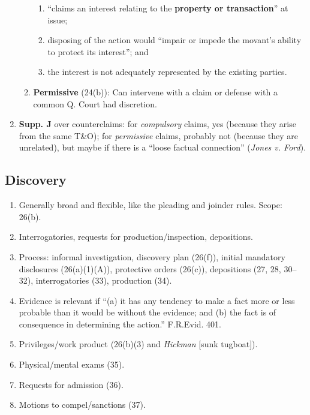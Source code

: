 \begin{enumerate}
\begin{enumerate}
        \begin{enumerate}
            \item ``claims an interest relating to the \textbf{property or 
            transaction}'' at issue;
            \item disposing of the action would ``impair or impede the 
            movant's ability to protect its interest''; and
            \item the interest is not adequately represented by the existing 
            parties.
        \end{enumerate}
        \item \textbf{Permissive} (24(b)): Can intervene with a claim or 
        defense with a common Q. Court had discretion.
    \end{enumerate}
    \item \textbf{Supp. J} over counterclaims: for \emph{compulsory} claims, 
    yes (because they arise from the same T\&O); for \emph{permissive} claims, 
    probably not (because they are unrelated), but maybe if there is a ``loose 
    factual connection'' (\emph{Jones v. Ford}).
\end{enumerate}

\subsection{Discovery}

\begin{enumerate}
    \item Generally broad and flexible, like the pleading and joinder rules.  
    Scope: 26(b).
    \item Interrogatories, requests for production/inspection, depositions.
    \item Process: informal investigation, discovery plan (26(f)), initial 
    mandatory disclosures (26(a)(1)(A)), protective orders (26(c)), 
    depositions (27, 28, 30--32), interrogatories (33), production (34).
    \item Evidence is relevant if ``(a) it has any tendency to make a fact 
    more or less probable than it would be without the evidence; and (b) the 
    fact is of consequence in determining the action.'' F.R.Evid. 401.
    \item Privileges/work product (26(b)(3) and \emph{Hickman} [sunk 
    tugboat]).
    \item Physical/mental exams (35).
    \item Requests for admission (36).
    \item Motions to compel/sanctions (37).
\end{enumerate}

